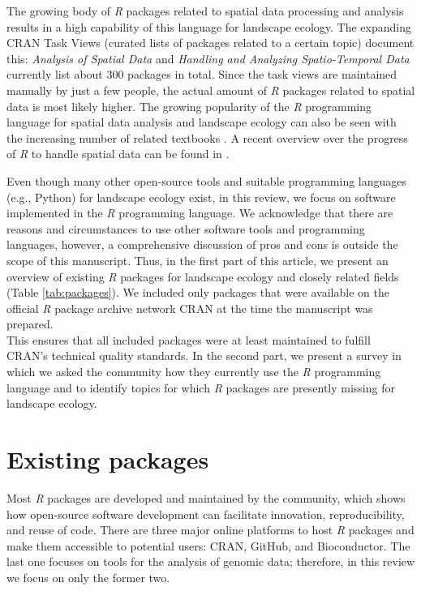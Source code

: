 \documentclass[smallextended]{svjour3}       %
\begin{document}
The growing body of \textit{R} packages related to spatial data processing and analysis results in a high capability of this language for landscape ecology.
The expanding CRAN Task Views (curated lists of packages related to a certain topic) document this: \textit{Analysis of Spatial Data} \cite{Bivand2019a} and \textit{Handling and Analyzing Spatio-Temporal Data} \cite{Pebesma2020} currently list about 300 packages in total.
Since the task views are maintained manually by just a few people, the actual amount of \textit{R} packages related to spatial data is most likely higher.
The growing popularity of the \textit{R} programming language for spatial data analysis and landscape ecology can also be seen with the increasing number of related textbooks \cite{Wegmann2016,Fletcher2018,Lovelace2019,Pebesma2019a}.
A recent overview over the progress of \textit{R} to handle spatial data can be found in \cite{Bivand2020}.

Even though many other open-source tools \cite{QGISDevelopmentTeam2016,GRASSDevelopmentTeam2017,Porta2017} and suitable programming languages (e.g., Python) for landscape ecology exist, in this review, we focus on software implemented in the \textit{R} programming language.
We acknowledge that there are reasons and circumstances to use other software tools and programming languages, however, a comprehensive discussion of pros and cons is outside the scope of this manuscript.
Thus, in the first part of this article, we present an overview of existing \textit{R} packages for landscape ecology and closely related fields (Table \ref{tab:packages}).
We included only packages that were available on the official \textit{R} package archive network CRAN at the time the manuscript was prepared.\\
This ensures that all included packages were at least maintained to fulfill CRAN's technical quality standards.
In the second part, we present a survey in which we asked the community how they currently use the \textit{R} programming language and to identify topics for which \textit{R} packages are presently missing for landscape ecology.

\hypertarget{sec:existing_packages}{%
\section{Existing packages}\label{sec:existing_packages}}

Most \textit{R} packages are developed and maintained by the community, which shows how open-source software development can facilitate innovation, reproducibility, and reuse of code.
There are three major online platforms to host \textit{R} packages and make them accessible to potential users: CRAN, GitHub, and Bioconductor.
The last one focuses on tools for the analysis of genomic data; therefore, in this review we focus on only the former two.
\end{document}
